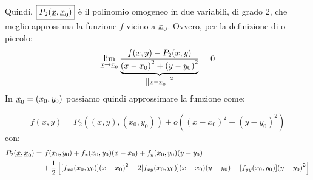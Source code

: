 Quindi, \(\boxed{P_2(\underline{x}, \underline{x}_0)}\) è il polinomio omogeneo in due variabili, di grado 2, che meglio approssima la funzione \(f\) vicino a \(\underline{x}_0\). Ovvero, per la definizione di o piccolo:
\[
    \lim_{\underline{x} \to \underline{x}_0} \frac{f(x,y) - P_2(x,y)}{\underbrace{{(x-x_0)}^2 + {(y-y_0)}^2}_{\left\lVert\underline{x}-\underline{x}_0\right\rVert^2}} = 0
\]
In \(\underline{x}_0 = (x_0,y_0)\) possiamo quindi approssimare la funzione come:

\[
    f(x,y) = P_2((x,y), (x_0, y_0)) + o({(x-x_0)}^{2} + {(y-y_0)}^{2})
\]
con:
\begin{align*}
    P_2(\underline{x}, \underline{x}_0) = & \ f(x_0,y_0) + f_x(x_0,y_0) (x-x_0) + f_y(x_0,y_0) (y-y_0)                                                                      \\
                      & + \frac{1}{2} \left[ [f_{xx}(x_0,y_0)]{(x-x_0)}^{2} + 2[f_{xy}(x_0,y_0)](x-x_0)(y-y_0) + [f_{yy}(x_0,y_0)]{(y-y_0)}^{2} \right]
\end{align*}
